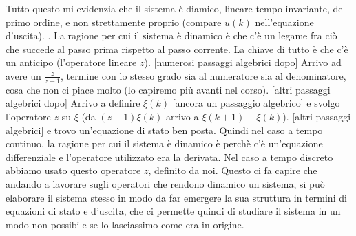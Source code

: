 Tutto questo mi evidenzia che il sistema è diamico, lineare tempo invariante, del primo ordine, e non strettamente proprio (compare $u(k)$ nell'equazione d'uscita).\newline
{}.\newline
La ragione per cui il sistema è dinamico è che c'è un legame fra ciò che succede al passo prima rispetto al passo corrente. La chiave di tutto è che c'è un anticipo (l'operatore lineare $z$). [numerosi passaggi algebrici dopo] Arrivo ad avere un $\frac{z}{z-1}$, termine con lo stesso grado sia al numeratore sia al denominatore, cosa che non ci piace molto (lo capiremo più avanti nel corso). [altri passaggi algebrici dopo] Arrivo a definire $\xi(k)$ [ancora un passaggio algebrico] e svolgo l'operatore $z$ su $\xi$ (da $(z-1)\xi(k)$ arrivo a $\xi(k+1) - \xi(k)$). [altri passaggi algebrici] e trovo un'equazione di stato ben posta.\newline
Quindi nel caso a tempo continuo, la ragione per cui il sistema è dinamico è perchè c'è un'equazione differenziale e l'operatore utilizzato era la derivata. Nel caso a tempo discreto abbiamo usato questo operatore $z$, definito da noi.\newline
Questo ci fa capire che andando a lavorare sugli operatori che rendono dinamico un sistema, si può elaborare il sistema stesso in modo da far emergere la sua struttura in termini di equazioni di stato e d'uscita, che ci permette quindi di studiare il sistema in un modo non possibile se lo lasciassimo come era in origine.